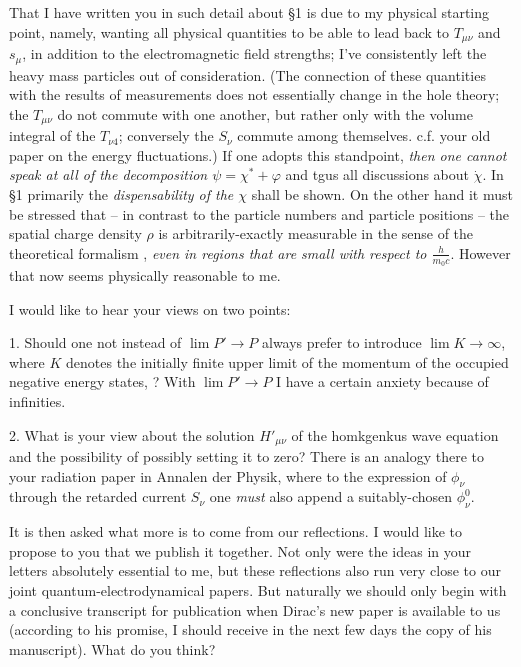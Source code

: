 \documentclass{article}
\begin{document}
That I have written you in such detail about §1 is due to my physical starting point, namely, wanting all physical quantities to be able to lead back to $T_{\mu\nu}$ and $s_\mu$, in addition to the electromagnetic field strengths; I've consistently left the heavy mass particles out of consideration. (The connection of these quantities with the results of measurements does not essentially change in the hole theory; the $T_{\mu\nu}$ do not commute with one another, but rather only with the volume integral of the $T_{\nu4}$; conversely the $S_\nu$ commute among themselves. c.f. your old paper on the energy fluctuations.) If one adopts this standpoint, \textit{then one cannot speak at all of the decomposition $\psi = \chi^* + \varphi$} and tgus all discussions about $\dot{\chi}$. In §1 primarily the \textit{dispensability of the $\chi$} shall be shown.
On the other hand it must be stressed that -- in contrast to the  particle numbers and particle positions -- the spatial charge density $\rho$ is arbitrarily-exactly measurable in the sense of the theoretical formalism , \textit{even in regions that are small with respect to $\frac{h}{m_0 c}$}.
However that now seems physically reasonable to me.

I would like to hear your views on two points:

1. Should one not instead of $\lim P' \to P$ always prefer to introduce $\lim K \to \infty$, where $K$ denotes the initially finite upper limit of the momentum  of the occupied negative energy states, ? With $\lim P' \to P$ I have a certain anxiety because of infinities.

2. What is your view about the  solution $H'_{\mu\nu}$ of the homkgenkus wave equation and the possibility of possibly setting it to zero? There is an analogy there to your radiation paper in Annalen der Physik, where to the expression of $\phi_\nu$ through the retarded current $S_\nu$ one \textit{must} also append a suitably-chosen $\phi^0_\nu$.

It is then asked what more is to come from our reflections. I would like to propose to you that we publish it together. Not only were the ideas in your letters absolutely essential to me, but these reflections also run very close to our joint quantum-electrodynamical papers. But naturally we should only begin with a conclusive transcript for publication when Dirac's new paper is available to us (according to his promise, I should receive in the next few days the copy of his manuscript). What do you think?
\end{document}
